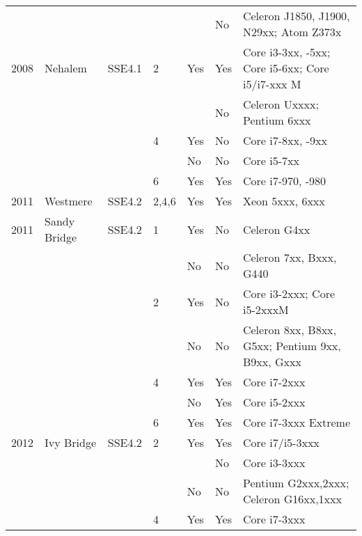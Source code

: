 \begin{longtable}{lllllll}
     &              &             &       &     & No     & Celeron J1850, J1900, N29xx; Atom Z373x          \\
2008 & Nehalem      & SSE4.1      & 2     & Yes & Yes    & Core i3-3xx, -5xx; Core i5-6xx; Core i5/i7-xxx M \\
     &              &             &       &     & No     & Celeron Uxxxx; Pentium 6xxx                      \\
     &              &             & 4     & Yes & No     & Core i7-8xx, -9xx                                \\
     &              &             &       & No  & No     & Core i5-7xx                                      \\
     &              &             & 6     & Yes & Yes    & Core i7-970, -980                                \\
2011 & Westmere     & SSE4.2      & 2,4,6 & Yes & Yes    & Xeon 5xxx, 6xxx                                  \\
2011 & Sandy Bridge & SSE4.2      & 1     & Yes & No     & Celeron G4xx                                     \\
     &              &             &       & No  & No     & Celeron 7xx, Bxxx, G440                          \\
     &              &             & 2     & Yes & No     & Core i3-2xxx; Core i5-2xxxM                      \\
     &              &             &       & No  & No     & Celeron 8xx, B8xx, G5xx; Pentium 9xx, B9xx, Gxxx \\
     &              &             & 4     & Yes & Yes    & Core i7-2xxx                                     \\
     &              &             &       & No  & Yes    & Core i5-2xxx                                     \\
     &              &             & 6     & Yes & Yes    & Core i7-3xxx Extreme                             \\
2012 & Ivy Bridge   & SSE4.2      & 2     & Yes & Yes    & Core i7/i5-3xxx                                  \\
     &              &             &       &     & No     & Core i3-3xxx                                     \\
     &              &             &       & No  & No     & Pentium G2xxx,2xxx; Celeron G16xx,1xxx           \\
     &              &             & 4     & Yes & Yes    & Core i7-3xxx                                     \\

\end{longtable}

